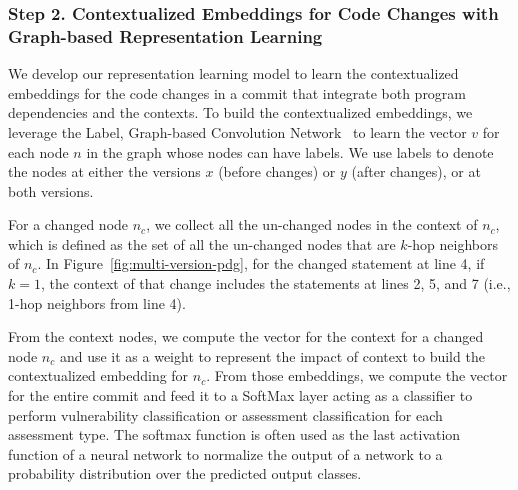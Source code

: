 





\subsubsection*{{\bf Step 2. Contextualized Embeddings for Code Changes with
    Graph-based Representation Learning}}
We develop our representation learning model to learn the
contextualized embeddings for the code changes in a commit that
integrate both program dependencies and the contexts. To build the
contextualized embeddings, we leverage the Label, Graph-based
Convolution Network~\cite{label-gcn} to learn the vector $v$ for each
node $n$ in the graph whose nodes can have labels. We use labels to
denote the nodes at either the versions $x$ (before changes) or $y$
(after changes), or at both versions.

For a changed node $n_c$, we collect all the un-changed nodes in the
context of $n_c$, which is defined as the set of all the un-changed
nodes that are $k$-hop neighbors of $n_c$. In
Figure~\ref{fig:multi-version-pdg}, for the changed statement at line
4, if $k=1$, the context of that change includes the statements at
lines 2, 5, and 7 (i.e., 1-hop neighbors from line 4).

From the context nodes, we compute the vector for the context for a
changed node $n_c$ and use it as a weight to represent the impact of
context to build the contextualized embedding for $n_c$.  From those
embeddings, we compute the vector for the entire commit and feed it to
a SoftMax layer acting as a classifier to perform vulnerability
classification or assessment classification for each assessment
type. The softmax function is often used as the last activation
function of a neural network to normalize the output of a network to a
probability distribution over the predicted output classes.

